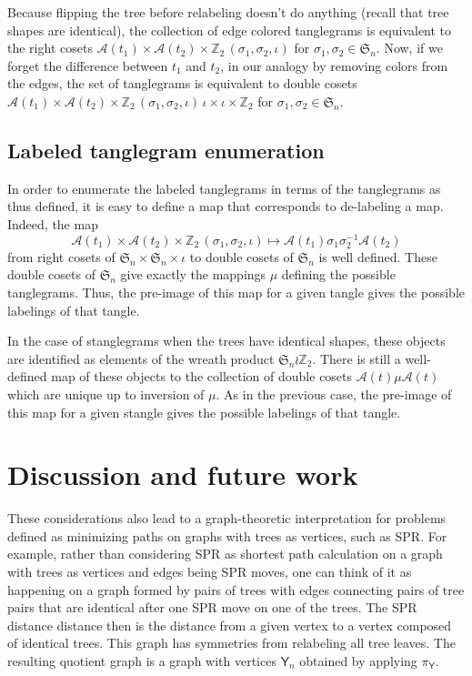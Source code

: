 \documentclass{amsart}
\newcommand{\ZZ}{\mathbb Z}
\newcommand{\fS}{\mathfrak S}
\newcommand{\aut}{\mathcal A}
\newcommand{\pairing}{\mu}
\newcommand{\tangle}{\mathsf{Y}}
\newcommand{\id}{\iota}
\newcommand{\wrtwo}{\wr \ZZ_2}
\begin{document}
Because flipping the tree before relabeling doesn't do anything (recall that tree shapes are identical), the collection of edge colored tanglegrams is equivalent to the right cosets $\aut(t_1) \times \aut(t_2) \times \ZZ_2 \, (\sigma_1, \sigma_2, \id)$ for $\sigma_1, \sigma_2 \in \fS_n$.
Now, if we forget the difference between $t_1$ and $t_2$, in our analogy by removing colors from the edges, the set of tanglegrams is equivalent to double cosets
$\aut(t_1) \times \aut(t_2) \times \ZZ_2 \, (\sigma_1, \sigma_2, \id) \, {\id} \times {\id} \times \ZZ_2$ for $\sigma_1, \sigma_2 \in \fS_n$.


\subsection{Labeled tanglegram enumeration}
In order to enumerate the labeled tanglegrams in terms of the tanglegrams as thus defined, it is easy to define a map that corresponds to de-labeling a map.
Indeed, the map
\[
\aut(t_1) \times \aut(t_2) \times \ZZ_2 \, (\sigma_1, \sigma_2, \id) \mapsto \aut(t_1) \sigma_1 \sigma_2^{-1} \aut(t_2)
\]
from right cosets of $\fS_n \times \fS_n \times \id$ to double cosets of $\fS_n$ is well defined.
These double cosets of $\fS_n$ give exactly the mappings $\pairing$ defining the possible tanglegrams.
Thus, the pre-image of this map for a given tangle gives the possible labelings of that tangle.

In the case of stanglegrams when the trees have identical shapes, these objects are identified as elements of the wreath product $\fS_n \wrtwo$.
There is still a well-defined map of these objects to the collection of double cosets $\aut(t) \pairing \aut(t)$ which are unique up to inversion of $\pairing$.
As in the previous case, the pre-image of this map for a given stangle gives the possible labelings of that tangle.



\section{Discussion and future work}
These considerations also lead to a graph-theoretic interpretation for problems defined as minimizing paths on graphs with trees as vertices, such as SPR.
For example, rather than considering SPR as shortest path calculation on a graph with trees as vertices and edges being SPR moves, one can think of it as happening on a graph formed by pairs of trees with edges connecting pairs of tree pairs that are identical after one SPR move on one of the trees.
The SPR distance distance then is the distance from a given vertex to a vertex composed of identical trees.
This graph has symmetries from relabeling all tree leaves.
The resulting quotient graph is a graph with vertices $\tangle_n$ obtained by applying $\pi_\tangle$.
\end{document}
